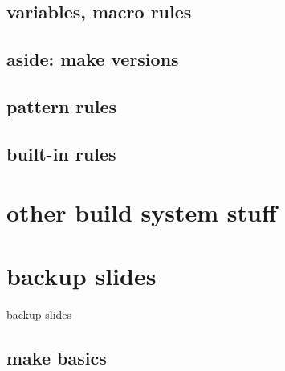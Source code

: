 

\subsection{variables, macro rules}



\subsection{aside: make versions}



\subsection{pattern rules}



\subsection{built-in rules}



\section{other build system stuff}






\section{backup slides}
\begin{frame}{backup slides}
\end{frame}

\subsection{make basics}





